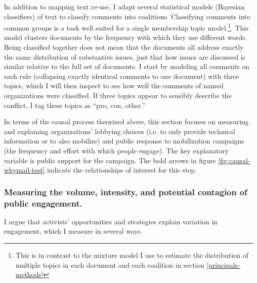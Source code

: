 
In addition to mapping text re-use, I adapt several statistical models (Bayesian classifiers) of text to classify comments into coalitions. Classifying comments into common groups is a task well suited for a single membership topic model.\footnote{
This is in contrast to the mixture model I use to estimate the distribution of multiple topics in each document and each coalition in section \ref{principals-methods}
}. 
This model clusters documents by the frequency with which they use different words. Being classified together does not mean that the documents all address exactly the same distribution of substantive issues, just that how issues are discussed is similar relative to the full set of documents.
I start by modeling all comments on each rule (collapsing exactly identical comments to one document) with three topics, which I will then inspect to see how well the comments of named organizations were classified. If three topics appear to sensibly describe the conflict, I tag these topics as ``pro, con, other.'' 





In terms of the causal process theorized above, this section focuses on measuring and explaining organizations' lobbying choices (i.e. to only provide technical information or to also mobilize) and public response to mobilization campaigns (the frequency and effort with which people engage). The key explanatory variable is public support for the campaign. The bold arrows in figure \ref{fig:causal-whymail-test} indicate the relationships of interest for this step.







\subsubsection{Measuring the volume, intensity, and potential contagion of public engagement.}

I argue that activists' opportunities and strategies explain variation in engagement, which I measure in several ways. 

